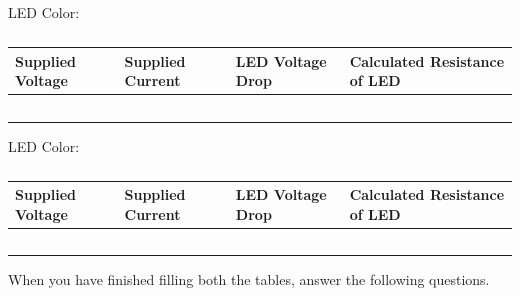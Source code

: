 \documentclass[12pt]{article}
\begin{document}
\begin{table}[H]
    \centering
    LED Color: \underline{\hspace{2cm}}
    
    \begin{tabular}{|l|l|l|l|}
        \hline
            Supplied Voltage & Supplied Current & LED Voltage Drop & Calculated Resistance of LED \\ \hline \hline
            &                  &               &           \\ \hline
            &                  &            &              \\ \hline
            &                  &             &             \\ \hline
            &                  &              &            \\ \hline
            &                  &               &           \\ \hline
    \end{tabular}
    
    LED Color: \underline{\hspace{2cm}}
    
    
    \begin{tabular}{|l|l|l|l|}
        \hline
            Supplied Voltage & Supplied Current & LED Voltage Drop & Calculated Resistance of LED \\ \hline \hline
            &                  &               &           \\ \hline
            &                  &            &              \\ \hline
            &                  &             &             \\ \hline
            &                  &              &            \\ \hline
            &                  &               &           \\ \hline
    \end{tabular}
    \caption{}
\end{table}

When you have finished filling both the tables, answer the following questions.
\end{document}
